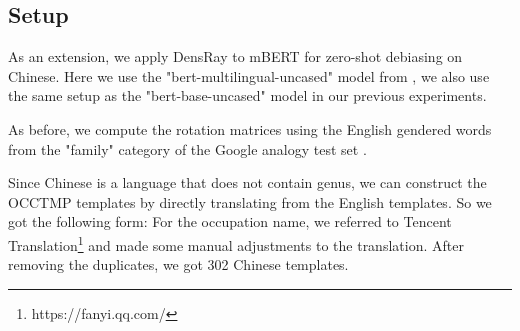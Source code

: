 \subsection{Setup}
As an extension, we apply DensRay to mBERT for zero-shot debiasing on Chinese. Here we use the "bert-multilingual-uncased" model from \citep{wolf2019huggingfaces}, we also use the same setup as the "bert-base-uncased" model in our previous experiments.

As before, we compute the rotation matrices using the English gendered words from the "family" category of the Google analogy test set \citep{mikolov2013efficient}.

Since Chinese is a language that does not contain genus, we can construct the OCCTMP templates by directly translating from the English templates. So we got the following form:  For the occupation name, we referred to Tencent Translation\footnote{https://fanyi.qq.com/} and made some manual adjustments to the translation. After removing the duplicates, we got 302 Chinese templates.

